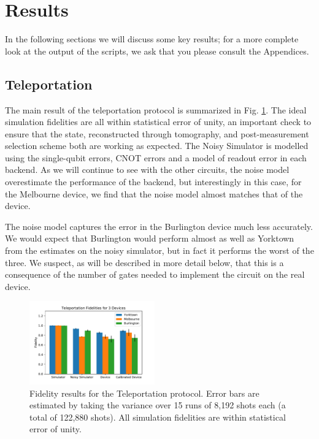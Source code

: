 \section{Results} In the following sections we will discuss some key results;
for a more complete look at the output of the scripts, we ask that you please
consult the Appendices.

\subsection{Teleportation} The main result of the teleportation protocol is
summarized in Fig. \ref{fig:teleport_histogram}. The ideal simulation fidelities
are all within statistical error of unity, an important check to ensure that the
state, reconstructed through tomography, and post-measurement selection scheme
both are working as expected. The Noisy Simulator is modelled using the
single-qubit errors, CNOT errors and a model of readout error in each backend.
As we will continue to see with the other circuits, the noise model overestimate
the performance of the backend, but interestingly in this case, for the
Melbourne device, we find that the noise model almost matches that of the
device.

The noise model captures the error in the Burlington device much less
accurately. We would expect that Burlington would perform almost as well as
Yorktown from the estimates on the noisy simulator, but in fact it performs the
worst of the three. We suspect, as will be described in more detail below, that
this is a consequence of the number of gates needed to implement the circuit on
the real device. 

\begin{figure}[h] \centering
\includegraphics[width=0.48\textwidth]{images/results/teleport_histogram.pdf}
  \caption{Fidelity results for the Teleportation protocol. Error bars are
estimated by taking the variance over 15 runs of 8,192 shots each (a total of
122,880 shots). All simulation fidelities are within statistical error of
unity.}
  \label{fig:teleport_histogram}
\end{figure}

